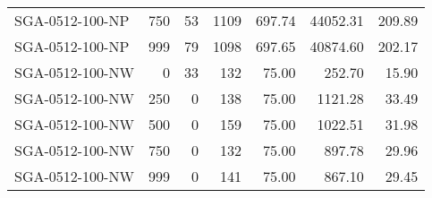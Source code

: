\begin{table}[htbp]
{\begin{tabular}{lrrrrrr}
    SGA-0512-100-NP & 750    & 53     & 1109   & 697.74 & 44052.31 & 209.89 \\
    SGA-0512-100-NP & 999    & 79     & 1098   & 697.65 & 40874.60 & 202.17 \\ \hline
    SGA-0512-100-NW & 0      & 33     & 132    & 75.00  & 252.70 & 15.90 \\
    SGA-0512-100-NW & 250    & 0      & 138    & 75.00  & 1121.28 & 33.49 \\
    SGA-0512-100-NW & 500    & 0      & 159    & 75.00  & 1022.51 & 31.98 \\
    SGA-0512-100-NW & 750    & 0      & 132    & 75.00  & 897.78 & 29.96 \\
    SGA-0512-100-NW & 999    & 0      & 141    & 75.00  & 867.10 & 29.45 \\
    \bottomrule
    \end{tabular}}
  \label{tab:addlabel}%
\end{table}%
